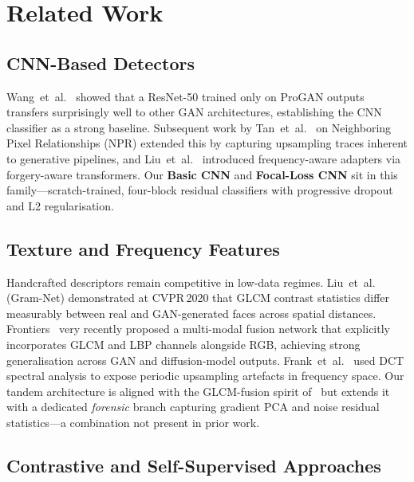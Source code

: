 \documentclass[10pt,twocolumn]{article}
\begin{document}
\section{Related Work}
\label{sec:related}

\subsection{CNN-Based Detectors}

Wang~et~al.~\cite{wang2020cnns} showed that a ResNet-50 trained
only on ProGAN outputs transfers surprisingly well to other GAN
architectures, establishing the CNN classifier as a strong baseline.
Subsequent work by Tan~et~al.~\cite{tan2024npr} on Neighboring Pixel
Relationships (NPR) extended this by capturing upsampling traces
inherent to generative pipelines, and Liu~et~al.~\cite{liu2024fatf}
introduced frequency-aware adapters via forgery-aware transformers.
Our \textbf{Basic CNN} and \textbf{Focal-Loss CNN} sit in this
family---scratch-trained, four-block residual classifiers with
progressive dropout and L2 regularisation.

\subsection{Texture and Frequency Features}

Handcrafted descriptors remain competitive in low-data regimes.
Liu~et~al.~\cite{liu2020gram} (Gram-Net) demonstrated at CVPR\,2020 that
GLCM contrast statistics differ measurably between real and GAN-generated
faces across spatial distances.
Frontiers~\cite{frontiers2025multimodal} very recently proposed a
multi-modal fusion network that explicitly incorporates GLCM and LBP
channels alongside RGB, achieving strong generalisation across GAN and
diffusion-model outputs.
Frank~et~al.~\cite{frank2020leveraging} used DCT spectral analysis
to expose periodic upsampling artefacts in frequency space.
Our tandem architecture is aligned with the GLCM-fusion spirit
of~\cite{frontiers2025multimodal} but extends it with a dedicated
\emph{forensic} branch capturing gradient PCA and noise residual
statistics---a combination not present in prior work.

\subsection{Contrastive and Self-Supervised Approaches}
\end{document}
